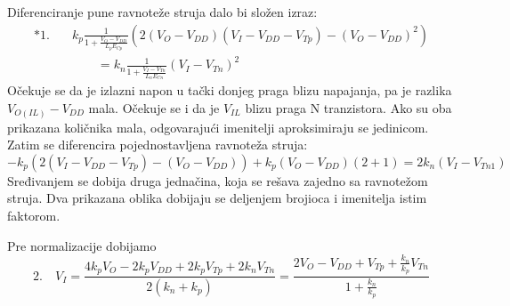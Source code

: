 Diferenciranje pune ravnoteže struja dalo bi složen izraz:
\[\begin{aligned}*1.\quad&k_p\frac1{1+\frac{V_O-V_{DD}}{L_pE_{Cp}}}\left(2(V_O-V_{DD})(V_I-V_{DD}-V_{Tp})-(V_O-V_{DD})^2\right)\\&\qquad=k_n\frac1{1+\frac{V_I-V_{Tn}}{L_nE_{Cn}}}(V_I-V_{Tn})^2\end{aligned}\]
Očekuje se da je izlazni napon u tački donjeg praga blizu napajanja, pa je razlika $V_{O(IL)}-V_{DD}$ mala. Očekuje se i da je $V_{IL}$ blizu praga N tranzistora. Ako su oba prikazana količnika mala, odgovarajući imenitelji aproksimiraju se jedinicom. Zatim se diferencira pojednostavljena ravnoteža struja:
\[-k_p\left(2(V_I-V_{DD}-V_{Tp})-(V_O-V_{DD})\right)+k_p(V_O-V_{DD})(2+1)=2k_n(V_I-V_{Tn1})\]
Sređivanjem se dobija druga jednačina, koja se rešava zajedno sa ravnotežom struja. Dva prikazana oblika dobijaju se deljenjem brojioca i imenitelja istim faktorom.

Pre normalizacije dobijamo
\[2.\quad V_I=\frac{4k_pV_O-2k_pV_{DD}+2k_pV_{Tp}+2k_nV_{Tn}}{2(k_n+k_p)}=\frac{2V_O-V_{DD}+V_{Tp}+\frac{k_n}{k_p}V_{Tn}}{1+\frac{k_n}{k_p}}\]
